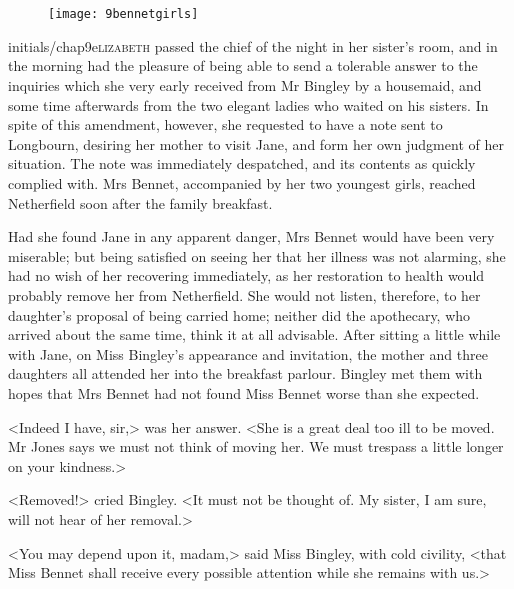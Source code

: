 
\chapter[Chapter \thechapter]{}
	
	\begin{figure}[t!]
\centering
\texttt{[image: 9bennetgirls]}
\end{figure}

	\lettrine[lines=6,image=true]{initials/chap9e}{lizabeth}  passed the chief of the night in her sister's room, and in the morning had the pleasure of being able to send a tolerable answer to the inquiries which she very early received from Mr Bingley by a housemaid, and some time afterwards from the two elegant ladies who waited on his sisters. In spite of this amendment, however, she requested to have a note sent to Longbourn, desiring her mother to visit Jane, and form her own judgment of her situation. The note was immediately despatched, and its contents as quickly complied with. Mrs Bennet, accompanied by her two youngest girls, reached Netherfield soon after the family breakfast.



Had she found Jane in any apparent danger, Mrs Bennet would have been very miserable; but being satisfied on seeing her that her illness was not alarming, she had no wish of her recovering immediately, as her restoration to health would probably remove her from Netherfield. She would not listen, therefore, to her daughter's proposal of being carried home; neither did the apothecary, who arrived about the same time, think it at all advisable. After sitting a little while with Jane, on Miss Bingley's appearance and invitation, the mother and three daughters all attended her into the breakfast parlour. Bingley met them with hopes that Mrs Bennet had not found Miss Bennet worse than she expected.

<Indeed I have, sir,> was her answer. <She is a great deal too ill to be moved. Mr Jones says we must not think of moving her. We must trespass a little longer on your kindness.>

<Removed!> cried Bingley. <It must not be thought of. My sister, I am sure, will not hear of her removal.>

<You may depend upon it, madam,> said Miss Bingley, with cold civility, <that Miss Bennet shall receive every possible attention while she remains with us.>

